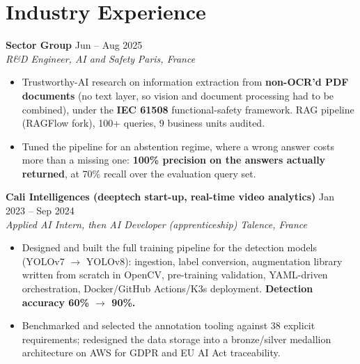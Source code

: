 \documentclass[10pt, letterpaper]{article}
\newcommand{\entry}[4]{%
  \noindent \textbf{#1} \hfill #2 \\
  \textit{#3} \hfill \textit{#4} \par
}
\begin{document}
\section{Industry Experience}

\entry{Sector Group}{Jun -- Aug 2025}{R\&D Engineer, AI and Safety}{Paris, France}
\begin{itemize}
    \item Trustworthy-AI research on information extraction from \textbf{non-OCR'd PDF documents} (no text layer, so vision and document processing had to be combined), under the \textbf{IEC 61508} functional-safety framework. RAG pipeline (RAGFlow fork), 100+ queries, 9 business units audited.
    \item Tuned the pipeline for an abstention regime, where a wrong answer costs more than a missing one: \textbf{100\% precision on the answers actually returned}, at 70\% recall over the evaluation query set.
\end{itemize}

\vspace{4pt}

\entry{Cali Intelligences (deeptech start-up, real-time video analytics)}{Jan 2023 -- Sep 2024}%
{Applied AI Intern, then AI Developer (apprenticeship)}{Talence, France}
\begin{itemize}
    \item Designed and built the full training pipeline for the detection models (YOLOv7 $\to$ YOLOv8): ingestion, label conversion, augmentation library written from scratch in OpenCV, pre-training validation, YAML-driven orchestration, Docker/GitHub Actions/K3s deployment. \textbf{Detection accuracy 60\% $\to$ 90\%.}
    \item Benchmarked and selected the annotation tooling against 38 explicit requirements; redesigned the data storage into a bronze/silver medallion architecture on AWS for GDPR and EU AI Act traceability.
\end{itemize}

\end{document}

